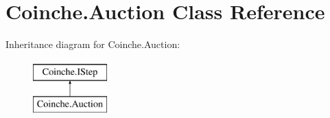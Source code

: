 \hypertarget{class_coinche_1_1_auction}{}\section{Coinche.\+Auction Class Reference}
\label{class_coinche_1_1_auction}
Inheritance diagram for Coinche.\+Auction\+:\begin{figure}[H]
\begin{center}
\leavevmode
\includegraphics[height=2.000000cm]{class_coinche_1_1_auction}
\end{center}
\end{figure}
